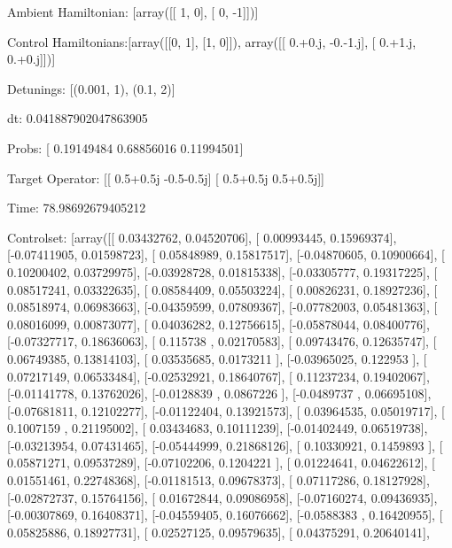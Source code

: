 \documentclass{article}
\begin{document}
    

\newpage

Ambient Hamiltonian: [array([[ 1,  0],
       [ 0, -1]])]

Control Hamiltonians:[array([[0, 1],
       [1, 0]]), array([[ 0.+0.j, -0.-1.j],
       [ 0.+1.j,  0.+0.j]])]

Detunings: [(0.001, 1), (0.1, 2)]

 dt: 0.041887902047863905

Probs: [ 0.19149484  0.68856016  0.11994501]

Target Operator: [[ 0.5+0.5j -0.5-0.5j]
 [ 0.5+0.5j  0.5+0.5j]]

Time: 78.98692679405212

Controlset: [array([[ 0.03432762,  0.04520706],
       [ 0.00993445,  0.15969374],
       [-0.07411905,  0.01598723],
       [ 0.05848989,  0.15817517],
       [-0.04870605,  0.10900664],
       [ 0.10200402,  0.03729975],
       [-0.03928728,  0.01815338],
       [-0.03305777,  0.19317225],
       [ 0.08517241,  0.03322635],
       [ 0.08584409,  0.05503224],
       [ 0.00826231,  0.18927236],
       [ 0.08518974,  0.06983663],
       [-0.04359599,  0.07809367],
       [-0.07782003,  0.05481363],
       [ 0.08016099,  0.00873077],
       [ 0.04036282,  0.12756615],
       [-0.05878044,  0.08400776],
       [-0.07327717,  0.18636063],
       [ 0.115738  ,  0.02170583],
       [ 0.09743476,  0.12635747],
       [ 0.06749385,  0.13814103],
       [ 0.03535685,  0.0173211 ],
       [-0.03965025,  0.122953  ],
       [ 0.07217149,  0.06533484],
       [-0.02532921,  0.18640767],
       [ 0.11237234,  0.19402067],
       [-0.01141778,  0.13762026],
       [-0.0128839 ,  0.0867226 ],
       [-0.0489737 ,  0.06695108],
       [-0.07681811,  0.12102277],
       [-0.01122404,  0.13921573],
       [ 0.03964535,  0.05019717],
       [ 0.1007159 ,  0.21195002],
       [ 0.03434683,  0.10111239],
       [-0.01402449,  0.06519738],
       [-0.03213954,  0.07431465],
       [-0.05444999,  0.21868126],
       [ 0.10330921,  0.1459893 ],
       [ 0.05871271,  0.09537289],
       [-0.07102206,  0.1204221 ],
       [ 0.01224641,  0.04622612],
       [ 0.01551461,  0.22748368],
       [-0.01181513,  0.09678373],
       [ 0.07117286,  0.18127928],
       [-0.02872737,  0.15764156],
       [ 0.01672844,  0.09086958],
       [-0.07160274,  0.09436935],
       [-0.00307869,  0.16408371],
       [-0.04559405,  0.16076662],
       [-0.0588383 ,  0.16420955],
       [ 0.05825886,  0.18927731],
       [ 0.02527125,  0.09579635],
       [ 0.04375291,  0.20640141],
\end{document}
